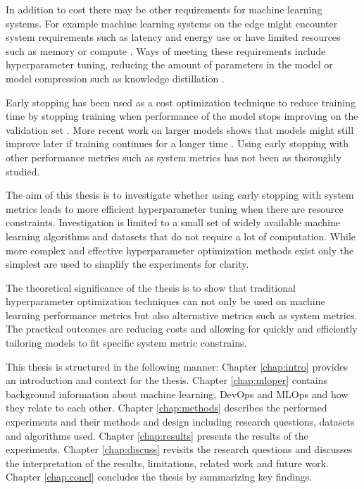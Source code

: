 In addition to cost there may be other requirements for machine learning systems. For example machine learning systems on the edge might encounter system requirements such as latency and energy use or have limited resources such as memory or compute \parencite{chenDeepLearningEdge2019}. Ways of meeting these requirements include hyperparameter tuning, reducing the amount of parameters in the model or model compression such as knowledge distillation \parencite{chenDeepLearningEdge2019}.

Early stopping has been used as a cost optimization technique to reduce training time by stopping training when performance of the model stops improving on the validation set \parencite{precheltAutomaticEarlyStopping1998}. More recent work on larger models shows that models might still improve later if training continues for a longer time \parencite{hofferTrainLongerGeneralize2018}. Using early stopping with other performance metrics such as system metrics has not been as thoroughly studied.


The aim of this thesis is to investigate whether using early stopping with system metrics leads to more efficient hyperparameter tuning when there are resource constraints. Investigation is limited to a small set of widely available machine learning algorithms and datasets that do not require a lot of computation. While more complex and effective hyperparameter optimization methods exist only the simplest are used to simplify the experiments for clarity.


The theoretical significance of the thesis is to show that traditional hyperparameter optimization techniques can not only be used on machine learning performance metrics but also alternative metrics such as system metrics. The practical outcomes are reducing costs and allowing for quickly and efficiently tailoring models to fit specific system metric constrains.

This thesis is structured in the following manner: Chapter \ref{chap:intro} provides an introduction and context for the thesis. Chapter \ref{chap:mloper} contains background information about machine learning, DevOps and MLOps and how they relate to each other. Chapter \ref{chap:methods} describes the performed experiments and their methods and design including research questions, datasets and algorithms used. Chapter \ref{chap:results} presents the results of the experiments. Chapter \ref{chap:discuss} revisits the research questions and discusses the interpretation of the results, limitations, related work and future work. Chapter \ref{chap:concl} concludes the thesis by summarizing key findings.